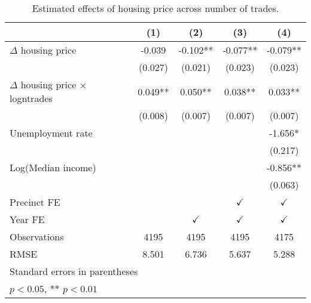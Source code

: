 \begin{table}[htbp]\centering
\caption{Estimated effects of housing price across number of trades.}\label{econactivity}
\begin{tabular}{l*{4}{c}}
\hline\hline
                    &\multicolumn{1}{c}{(1)}        &\multicolumn{1}{c}{(2)}        &\multicolumn{1}{c}{(3)}        &\multicolumn{1}{c}{(4)}        \\
\hline
$\Delta$ housing price&      -0.039        &      -0.102**&      -0.077**&      -0.079**\\
                    &     (0.027)        &     (0.021)        &     (0.023)        &     (0.023)        \\[1em]
$\Delta$ housing price $\times$ logntrades&       0.049**&       0.050**&       0.038**&       0.033**\\
                    &     (0.008)        &     (0.007)        &     (0.007)        &     (0.007)        \\[1em]
Unemployment rate   &                    &                    &                    &      -1.656*\\
                    &                    &                    &                    &     (0.217)        \\[1em]
Log(Median income)  &                    &                    &                    &      -0.856**\\
                    &                    &                    &                    &     (0.063)        \\[1em]
\hline Precinct FE  &                    &                    &$\checkmark$        &$\checkmark$        \\[1em]
Year FE             &                    &$\checkmark$        &$\checkmark$        &$\checkmark$        \\
\hline
Observations        &        4195        &        4195        &        4195        &        4175        \\
RMSE                &       8.501        &       6.736        &       5.637        &       5.288        \\
\hline\hline
\multicolumn{5}{l}{\footnotesize Standard errors in parentheses}\\
\multicolumn{5}{l}{\footnotesize * \(p<0.05\), ** \(p<0.01\)}\\
\end{tabular}
\end{table}
